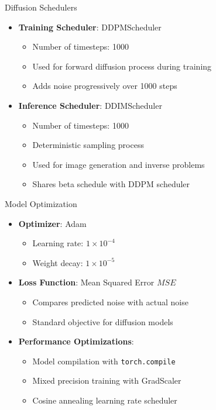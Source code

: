 \begin{frame}{Diffusion Schedulers}
    \begin{itemize}
        \item \textbf{Training Scheduler}: DDPMScheduler
              \begin{itemize}
                  \item Number of timesteps: 1000
                  \item Used for forward diffusion process during training
                  \item Adds noise progressively over 1000 steps
              \end{itemize}
        \item \textbf{Inference Scheduler}: DDIMScheduler
              \begin{itemize}
                  \item Number of timesteps: 1000
                  \item Deterministic sampling process
                  \item Used for image generation and inverse problems
                  \item Shares beta schedule with DDPM scheduler
              \end{itemize}
    \end{itemize}
\end{frame}

\begin{frame}{Model Optimization}
    \begin{itemize}
        \item \textbf{Optimizer}: Adam
              \begin{itemize}
                  \item Learning rate: $1\times 10^{-4}$
                  \item Weight decay: $1\times 10^{-5}$
              \end{itemize}
        \item \textbf{Loss Function}: Mean Squared Error \(MSE\)
              \begin{itemize}
                  \item Compares predicted noise with actual noise
                  \item Standard objective for diffusion models
              \end{itemize}
        \item \textbf{Performance Optimizations}:
              \begin{itemize}
                  \item Model compilation with \texttt{torch.compile}
                  \item Mixed precision training with GradScaler
                  \item Cosine annealing learning rate scheduler
              \end{itemize}
    \end{itemize}
\end{frame}

